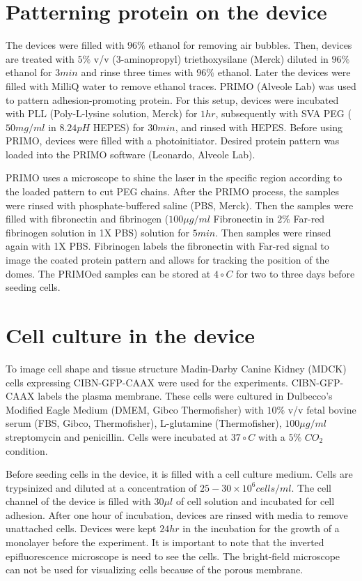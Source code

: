 \section{Patterning protein on the device}
The devices were filled with $96\%$ ethanol for removing air bubbles. Then, devices are treated with $5\%$ v/v (3-aminopropyl) triethoxysilane (Merck) diluted in $96\%$ ethanol for $3min$ and rinse three times with $96\%$ ethanol. Later the devices were filled with MilliQ water to remove ethanol traces. PRIMO (Alveole Lab) was used to pattern adhesion-promoting protein. For this setup, devices were incubated with PLL (Poly-L-lysine solution, Merck) for $1hr$, subsequently with SVA PEG ($50mg/ml$ in $8.24pH$ HEPES) for $30min$, and rinsed with HEPES. Before using PRIMO, devices were filled with a photoinitiator. Desired protein pattern was loaded into the PRIMO software (Leonardo, Alveole Lab). 

PRIMO uses a microscope to shine the laser in the specific region according to the loaded pattern to cut PEG chains. After the PRIMO process, the samples were rinsed with phosphate-buffered saline (PBS, Merck). Then the samples were filled with fibronectin and fibrinogen ($100\mu g/ml$ Fibronectin in $2\%$ Far-red fibrinogen solution in 1X PBS) solution for $5 min$. Then samples were rinsed again with 1X PBS. Fibrinogen labels the fibronectin with Far-red signal to image the coated protein pattern and allows for tracking the position of the domes. The PRIMOed samples can be stored at $4\circ C$ for two to three days before seeding cells.

\section{Cell culture in the device}

To image cell shape and tissue structure Madin-Darby Canine Kidney (MDCK) cells expressing CIBN-GFP-CAAX were used for the experiments. CIBN-GFP-CAAX labels the plasma membrane. These cells were cultured in Dulbecco’s Modified Eagle Medium (DMEM, Gibco Thermofisher) with $10\%$ v/v fetal bovine serum (FBS, Gibco, Thermofisher), L-glutamine (Thermofisher), $100\mu g/ml$ streptomycin and penicillin. Cells were incubated at $37\circ C$ with a $5\%$ $CO_2$ condition. 

Before seeding cells in the device, it is filled with a cell culture medium. Cells are trypsinized and diluted at a concentration of $25-30\times10^6 cells/ml$. The cell channel of the device is filled with $30\mu l$ of cell solution and incubated for cell adhesion. After one hour of incubation, devices are rinsed with media to remove unattached cells. Devices were kept $24hr$ in the incubation for the growth of a monolayer before the experiment. It is important to note that the inverted epifluorescence microscope is need to see the cells. The bright-field microscope can not be used for visualizing cells because of the porous membrane.

